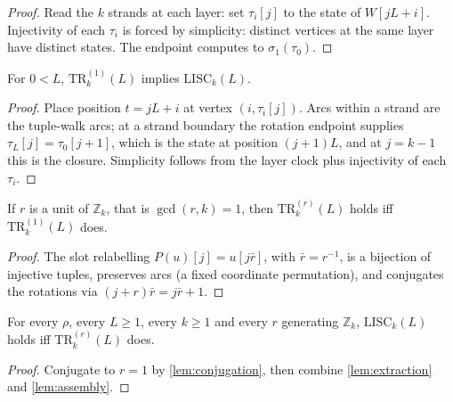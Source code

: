 \begin{proof}
\leanok
{}
Read the $k$ strands at each layer: set $\tau_i[j]$ to the state of $W[jL+i]$.
Injectivity of each $\tau_i$ is forced by simplicity: distinct vertices at the
same layer have distinct states. The endpoint computes to $\sigma_1(\tau_0)$.
\end{proof}

\begin{lemma}
\label{lem:assembly}
\leanok
{}
For $0 < L$, $\mathrm{TR}_k^{(1)}(L)$ implies $\mathrm{LISC}_k(L)$.
\end{lemma}

\begin{proof}
\leanok
{}
Place position $t = jL+i$ at vertex $(i, \tau_i[j])$. Arcs within a strand are
the tuple-walk arcs; at a strand boundary the rotation endpoint supplies
$\tau_L[j] = \tau_0[j+1]$, which is the state at position $(j+1)L$, and at
$j = k-1$ this is the closure. Simplicity follows from the layer clock plus
injectivity of each $\tau_i$.
\end{proof}

\begin{lemma}
\label{lem:conjugation}
\leanok
{}
If $r$ is a unit of $\mathbb{Z}_k$, that is $\gcd(r,k)=1$, then
$\mathrm{TR}_k^{(r)}(L)$ holds iff $\mathrm{TR}_k^{(1)}(L)$ does.
\end{lemma}

\begin{proof}
\leanok
{}
The slot relabelling $P(u)[j] = u[j\bar r]$, with $\bar r = r^{-1}$, is a
bijection of injective tuples, preserves arcs (a fixed coordinate permutation),
and conjugates the rotations via $(j+r)\bar r = j\bar r + 1$.
\end{proof}

\begin{theorem}
\label{thm:pruning}
\leanok
{}
For every $\rho$, every $L \geq 1$, every $k \geq 1$ and every $r$ generating
$\mathbb{Z}_k$, $\mathrm{LISC}_k(L)$ holds iff $\mathrm{TR}_k^{(r)}(L)$ does.
\end{theorem}

\begin{proof}
\leanok
{}
Conjugate to $r=1$ by \ref{lem:conjugation}, then combine \ref{lem:extraction}
and \ref{lem:assembly}.
\end{proof}

